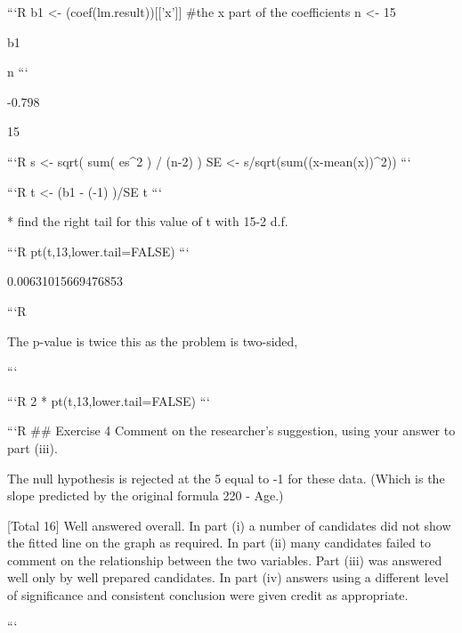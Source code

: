 ```R
b1 <- (coef(lm.result))[['x']] #the x part of the coefficients
n  <-  15

b1 %

n
```


-0.798



15



```R
s  <-  sqrt( sum( es^2 ) / (n-2) )
SE <-  s/sqrt(sum((x-mean(x))^2))
```


```R
t  <-  (b1 - (-1) )/SE
t
```

* find the right tail for this value of t with 15-2 d.f.


```R
pt(t,13,lower.tail=FALSE)
```


0.00631015669476853



```R

The p-value is twice this as the problem is two-sided,



```


```R
2 * pt(t,13,lower.tail=FALSE)
```


```R
## Exercise 4
Comment on the researcher’s suggestion, using your answer to part (iii). 




The null hypothesis is rejected at the 5%
equal to -1 for these data. (Which is the slope predicted by the original formula 220 -
Age.)

[Total 16]
Well answered overall. In part (i) a number of candidates did not show the fitted line on
the graph as required. In part (ii) many candidates failed to comment on the relationship
between the two variables. Part (iii) was answered well only by well prepared candidates.
In part (iv) answers using a different level of significance and consistent conclusion were
given credit as appropriate.

```
